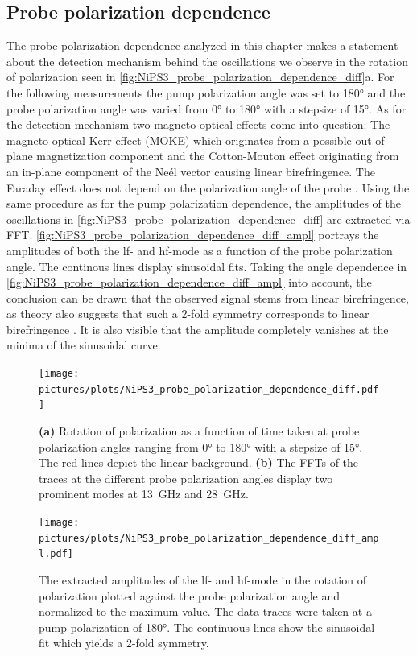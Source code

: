 \subsection{Probe polarization dependence}
The probe polarization dependence analyzed in this chapter makes a statement about the detection mechanism behind the oscillations we observe in the rotation of polarization seen in \autoref{fig:NiPS3_probe_polarization_dependence_diff}a.
For the following measurements the pump polarization angle was set to 180° and the probe polarization angle was varied from 0° to 180° with a stepsize of 15°.
As for the detection mechanism two magneto-optical effects come into question:
The magneto-optical Kerr effect (MOKE) which originates from a possible out-of-plane magnetization component and the Cotton-Mouton effect originating from an in-plane component of the Neél vector causing linear birefringence.
The Faraday effect does not depend on the polarization angle of the probe .
Using the same procedure as for the pump polarization dependence, the amplitudes of the oscillations in \autoref{fig:NiPS3_probe_polarization_dependence_diff} are extracted via FFT.
\autoref{fig:NiPS3_probe_polarization_dependence_diff_ampl} portrays the amplitudes of both the lf- and hf-mode as a function of the probe polarization angle.
The continous lines display sinusoidal fits.
Taking the angle dependence in \autoref{fig:NiPS3_probe_polarization_dependence_diff_ampl} into account, the conclusion can be drawn that the observed signal stems from linear birefringence, as theory also suggests that such a 2-fold symmetry corresponds to linear birefringence .
It is also visible that the amplitude completely vanishes at the minima of the sinusoidal curve.
\begin{figure}[hbt!]
    \centering
    \texttt{[image: pictures/plots/NiPS3\_probe\_polarization\_dependence\_diff.pdf]} \vspace{-0.3cm}
    \caption{\textbf{(a)} Rotation of polarization as a function of time taken at probe polarization angles ranging from 0° to 180° with a stepsize of 15°. The red lines depict the linear background. \textbf{(b)} The FFTs of the traces at the different probe polarization angles display two prominent modes at \qty{13}{GHz} and \qty{28}{GHz}.}
    \label{fig:NiPS3_probe_polarization_dependence_diff}
\end{figure}
\begin{figure}[hbt!]
    \centering  
    \texttt{[image: pictures/plots/NiPS3\_probe\_polarization\_dependence\_diff\_ampl.pdf]} \vspace{-0.3cm}
    \caption{The extracted amplitudes of the lf- and hf-mode in the rotation of polarization plotted against the probe polarization angle and normalized to the maximum value. The data traces were taken at a pump polarization of 180°. The continuous lines show the sinusoidal fit which yields a 2-fold symmetry.}
    \label{fig:NiPS3_probe_polarization_dependence_diff_ampl}
\end{figure}
